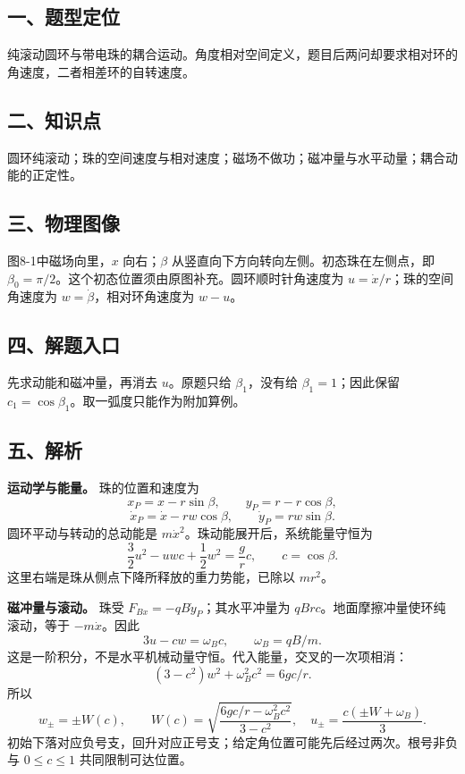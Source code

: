 \documentclass[12pt,a4paper,UTF8]{ctexart}
\begin{document}
\subsection{一、题型定位}\label{ux4e00ux9898ux578bux5b9aux4f4d-7}

纯滚动圆环与带电珠的耦合运动。角度相对空间定义，题目后两问却要求相对环的角速度，二者相差环的自转速度。

\subsection{二、知识点}\label{ux4e8cux77e5ux8bc6ux70b9-7}

圆环纯滚动；珠的空间速度与相对速度；磁场不做功；磁冲量与水平动量；耦合动能的正定性。

\subsection{三、物理图像}\label{ux4e09ux7269ux7406ux56feux50cf-7}

图8-1中磁场向里，\(x\) 向右；\(\beta\)
从竖直向下方向转向左侧。初态珠在左侧点，即
\(\beta_0=\pi/2\)。这个初态位置须由原图补充。圆环顺时针角速度为
\(u=\dot x/r\)；珠的空间角速度为 \(w=\dot\beta\)，相对环角速度为
\(w-u\)。

\subsection{四、解题入口}\label{ux56dbux89e3ux9898ux5165ux53e3-7}

先求动能和磁冲量，再消去 \(u\)。原题只给 \(\beta_1\)，没有给
\(\beta_1=1\)；因此保留 \(c_1=\cos\beta_1\)。取一弧度只能作为附加算例。

\subsection{五、解析}\label{ux4e94ux89e3ux6790-7}

\textbf{运动学与能量。} 珠的位置和速度为 \[
x_P=x-r\sin\beta,\qquad y_P=r-r\cos\beta,
\] \[
\dot x_P=\dot x-rw\cos\beta,\qquad \dot y_P=rw\sin\beta.
\] 圆环平动与转动的总动能是 \(m\dot x^2\)。珠动能展开后，系统能量守恒为
\[
\frac32u^2-uwc+\frac12w^2=\frac grc,\qquad c=\cos\beta.
\] 这里右端是珠从侧点下降所释放的重力势能，已除以 \(mr^2\)。

\textbf{磁冲量与滚动。} 珠受 \(F_{Bx}=-qB\dot y_P\)；其水平冲量为
\(qBr c\)。地面摩擦冲量使环纯滚动，等于 \(-m\dot x\)。因此 \[
3u-cw=\omega_Bc,\qquad \omega_B=qB/m.
\] 这是一阶积分，不是水平机械动量守恒。代入能量，交叉的一次项相消： \[
(3-c^2)w^2+\omega_B^2c^2=6gc/r.
\] 所以 \[
w_\pm=\pm W(c),\qquad
W(c)=\sqrt{\frac{6gc/r-\omega_B^2c^2}{3-c^2}},
\quad
u_\pm=\frac{c(\pm W+\omega_B)}3.
\]
初始下落对应负号支，回升对应正号支；给定角位置可能先后经过两次。根号非负与
\(0\le c\le1\) 共同限制可达位置。
\end{document}
